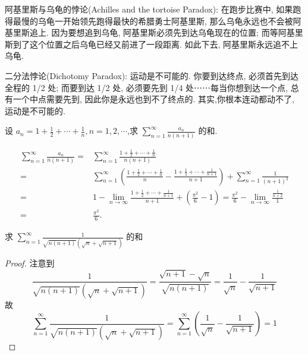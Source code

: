 \documentclass[color=green,titlestyle=hang]{elegantbook}%
\begin{document}
\par 阿基里斯与乌龟的悖论(Achilles and the tortoise Paradox): 在跑步比赛中, 如果跑得最慢的乌龟一开始领先跑得最快的希腊勇士阿基里斯, 那么乌龟永远也不会被阿基里斯追上. 因为要想追到乌龟, 阿基里斯必须先到达乌龟现在的位置; 而等阿基里斯到了这个位置之后乌龟已经又前进了一段距离. 如此下去, 阿基里斯永远追不上乌龟.

\par 二分法悖论(Dichotomy Paradox): 运动是不可能的. 你要到达终点, 必须首先到达全程的 1/2 处; 而要到达 1/2 处, 必须要先到 1/4 处⋯⋯每当你想到达一个点, 总有一个中点需要先到, 因此你是永远也到不了终点的. 其实,你根本连动都动不了, 运动是不可能的.

\begin{example}
设 ${a_n} = 1 + \frac{1}{2} + \cdots + \frac{1}{n},n = 1,2, \cdots$,求 $\sum\limits_{n = 1}^\infty {\frac{{{a_n}}}{{n\left( {n + 1} \right)}}}$ 的和.
\end{example}\begin{solution}
\begin{align*}
\sum\limits_{n = 1}^\infty {\frac{{{a_n}}}{{n\left( {n + 1} \right)}}} =& \sum\limits_{n = 1}^\infty {\frac{{1 + \frac{1}{2} + \cdots + \frac{1}{n}}}{{n\left( {n + 1} \right)}}} \\
=&\sum\limits_{n = 1}^\infty {\left( {\frac{{1 + \frac{1}{2} + \cdots + \frac{1}{n}}}{n} - \frac{{1 + \frac{1}{2} + \cdots + \frac{1}{{n + 1}}}}{{n + 1}}} \right)} + \sum\limits_{n = 1}^\infty {\frac{1}{{{{\left( {n + 1} \right)}^2}}}} \\
= & 1 - \mathop {\lim }\limits_{n \to \infty } \frac{{1 + \frac{1}{2} + \cdots + \frac{1}{{n + 1}}}}{{n + 1}} + \left( {\frac{{{\pi ^2}}}{6} - 1} \right) = \frac{{{\pi ^2}}}{6} - \mathop {\lim }\limits_{n \to \infty } \frac{{\frac{1}{{n + 2}}}}{1} \\
=& \frac{{{\pi ^2}}}{6}.
\end{align*}
\end{solution}

\begin{example}
求 $\sum_{n=1}^{\infty}\frac{1}{\sqrt{n(n+1)}(\sqrt{n}+\sqrt{n+1})}$ 的和	
\end{example}\begin{proof}
注意到
\[\frac{1}{\sqrt{n(n+1)} (\sqrt{n} + \sqrt{n+1})} = \frac{\sqrt{n+1} -\sqrt{n}}{\sqrt{n(n+1)}} = \frac1{\sqrt{n}} - \frac1{\sqrt{n+1}}\]
故\[\sum_{n=1}^{\infty}\frac{1}{\sqrt{n(n+1)} (\sqrt{n} + \sqrt{n+1})} 
=  \sum_{n=1}^{\infty}\left(\frac1{\sqrt{n}} - \frac1{\sqrt{n+1}}\right)=1\]
\end{proof}
\end{document}
